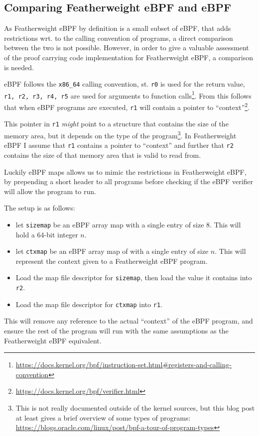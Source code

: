\subsection{Comparing Featherweight eBPF and eBPF}
\label{subsec:comparing_featherweight_ebpf_and_ebpf}

As Featherweight eBPF by definition is a small subset of eBPF, that adds restrictions wrt. to the calling convention of programs, a direct comparison between the two is not possible.
However, in order to give a valuable assessment of the proof carrying code implementation for Featherweight eBPF, a comparison is needed.


eBPF follows the \texttt{x86\_64} calling convention, st. \texttt{r0} is used for the return value, \texttt{r1, r2, r3, r4, r5} are used for arguments to function calls\footnote{\url{https://docs.kernel.org/bpf/instruction-set.html\#registers-and-calling-convention}}.
From this follows that when eBPF programs are executed, \texttt{r1} will contain a pointer to ``context''\footnote{
  \url{https://docs.kernel.org/bpf/verifier.html}}.

This pointer in \texttt{r1} \textit{might} point to a structure that contains the size of the memory area, but it depends on the type of the program\footnote{This is not really documented outside of the kernel sources, but this blog post at least gives a brief overview of some types of programs:
  \url{https://blogs.oracle.com/linux/post/bpf-a-tour-of-program-types}}.
In Featherweight eBPF I assume that \texttt{r1} contains a pointer to ``context'' and further that \texttt{r2} contains the size of that memory area that is valid to read from.

Luckily eBPF maps allows us to mimic the restrictions in Featherweight eBPF, by prepending a short header to all programs before checking if the eBPF verifier will allow the program to run.

The setup is as follows:

\begin{itemize}
\item let \texttt{sizemap} be an eBPF array map with a single entry of size 8. This will hold a 64-bit integer $n$.
\item let \texttt{ctxmap} be an eBPF array map of with a single entry of size $n$. This will represent the context given to a Featherweight eBPF program.
\item Load the map file descriptor for \texttt{sizemap}, then load the value it contains into \texttt{r2}.
  \item Load the map file descriptor for \texttt{ctxmap} into \texttt{r1}. 
  \end{itemize}
  This will remove any reference to the actual ``context'' of the eBPF program, and ensure the rest of the program will run with the same assumptions as the Featherweight eBPF equivalent.

